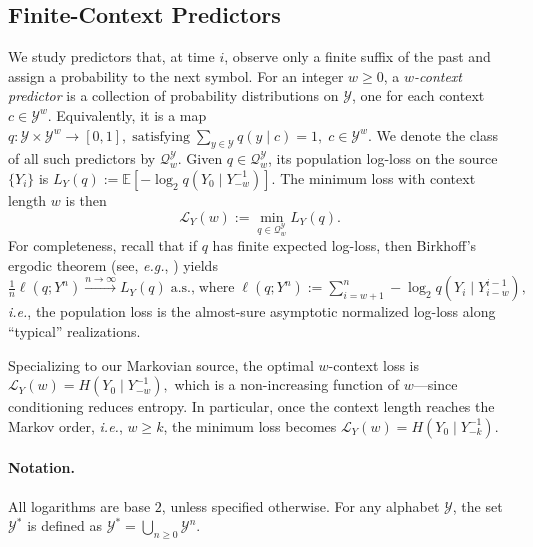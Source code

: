 \documentclass{article}
\theoremstyle{plain}
\theoremstyle{definition}
\theoremstyle{remark}
\begin{document}
    \subsection{Finite-Context Predictors}
    We study predictors that, at time $i$,
    observe only a finite suffix of the past and assign a probability to the
    next symbol. For an integer $w\geq 0$, a \emph{$w$-context predictor} is a collection
    of probability distributions on $\mathcal{Y}$, one for each context
    $c\in\mathcal{Y}^w$.  Equivalently, it is a map
    $
        q:\mathcal{Y}\times\mathcal{Y}^w \to [0,1], \; \text{satisfying} \;\sum_{y\in\mathcal{Y}} q(y\mid c)=1,
       \; c\in\mathcal{Y}^w .
    $
    We denote the class of all such predictors by
    $\mathcal{Q}_w^{\mathcal{Y}}$. Given $q\in\mathcal{Q}_w^{\mathcal{Y}}$, its population log-loss on the
    source $\{Y_i\}$ is
    $
        L_Y(q)
        :=
        \mathbb{E}
        \left[
            -\log_2 q\!\left(Y_0 \mid Y_{-w}^{-1}\right)
        \right].
        \label{eq:population-log-loss}
    $ The minimum loss with context length $w$ is then
    \begin{equation}
        \mathcal{L}_Y(w)
        :=
        \min_{q\in\mathcal{Q}_w^{\mathcal{Y}}} L_Y(q).
        \label{eq:optimal-population-loss}
    \end{equation}
    For completeness, recall that if $q$ has finite expected log-loss, then Birkhoff’s
    ergodic theorem (see, {\it{e.g.}}, \cite{coverElementsInformationTheory2005}) yields
    $
        \frac{1}{n}
        \ell(q;Y^n)
        \overset{n\to \infty}{\longrightarrow}
        L_Y(q)
    \; \text{a.s.,}
        \label{eq:empirical-to-population-loss}
        \; \text{where} 
        \;\ell(q;Y^n) :=  
        \sum_{i=w+1}^{n}
            -\log_2 q\!\left(Y_i \mid Y_{i-w}^{i-1}\right),
    $
    {\it i.e.}, the population loss is the almost-sure asymptotic normalized
    log-loss along ``typical''  realizations.
    
    Specializing to our Markovian source, the optimal $w$-context loss is
    $
        \mathcal{L}_Y(w)
        =
        H(Y_0\mid Y_{-w}^{-1}),
        \label{eq:optimal-loss-entropy}
    $
    which is a non-increasing function of $w$---since conditioning reduces entropy.
    In particular, once the context length reaches the Markov order, {\it{i.e.}}, $w \ge k$, the minimum loss becomes 
    $
        \mathcal{L}_Y(w)
        =
        H(Y_0\mid Y_{-k}^{-1}).
        \label{eq:markov-loss-saturation}
    $
    
    \paragraph{Notation.} All logarithms are base $2$, unless specified otherwise. For any alphabet $\mathcal{Y}$, the set $\mathcal{Y}^*$ is defined as $\mathcal{Y}^* = \bigcup_{n \ge 0} \mathcal{Y}^n$.
    
\end{document}
